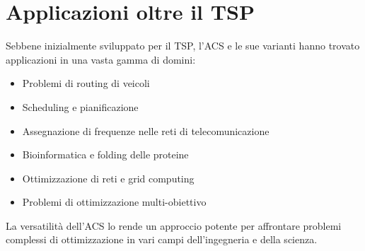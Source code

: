 \section{Applicazioni oltre il \gls{TSP}}

Sebbene inizialmente sviluppato per il \gls{TSP}, l'\gls{ACS} e le sue varianti hanno trovato applicazioni in una vasta gamma di domini:

\begin{itemize}
	\item Problemi di routing di veicoli
	\item Scheduling e pianificazione
	\item Assegnazione di frequenze nelle reti di telecomunicazione
	\item Bioinformatica e folding delle proteine
	\item Ottimizzazione di reti e grid computing
	\item Problemi di ottimizzazione multi-obiettivo
\end{itemize}

La versatilità dell'\gls{ACS} lo rende un approccio potente per affrontare problemi complessi di ottimizzazione in vari campi dell'ingegneria e della scienza.
